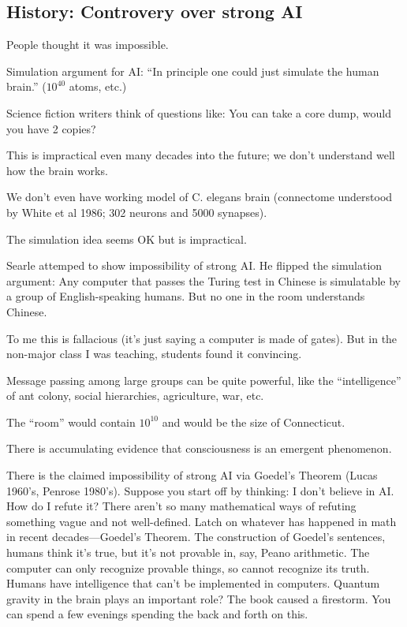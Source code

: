 \subsection{History: Controvery over strong AI}

People thought it was impossible.

Simulation argument for AI: ``In principle one could just simulate the human brain.'' ($10^{40}$ atoms, etc.)

Science fiction writers think of questions like: You can take a core dump, would you have 2 copies? 

This is impractical even many decades into the future; we don't understand well how the brain works.

We don't even have working model of C. elegans brain (connectome understood by White et al 1986; 302 neurons and 5000 synapses). 

The simulation idea seems OK but is impractical.

Searle attemped to show impossibility of strong AI. He flipped the simulation argument: Any computer that passes the Turing test in Chinese is simulatable by a group of English-speaking humans. But no one in the room understands Chinese.


To me this is fallacious (it's just saying a computer is made of gates). But in the non-major class I was teaching, students found it convincing.

Message passing among large groups can be quite powerful, like the ``intelligence'' of ant colony, social hierarchies, agriculture, war, etc.

The ``room'' would contain $10^{10}$ and would be the size of Connecticut.

There is accumulating evidence that consciousness is an emergent phenomenon.

There is the claimed impossibility of strong AI via Goedel's Theorem (Lucas 1960's, Penrose 1980's). Suppose you start off by thinking: I don't believe in AI. How do I refute it? There aren't so many mathematical ways of refuting something vague and not well-defined. Latch on whatever has happened in math in recent decades---Goedel's Theorem. The construction of Goedel's sentences, humans think it's true, but it's not provable in, say, Peano arithmetic. The computer can only recognize provable things, so cannot recognize its truth. Humans have intelligence that can't be implemented in computers.
Quantum gravity in the brain plays an important role?
The book caused a firestorm. You can spend a few evenings spending the back and forth on this.

